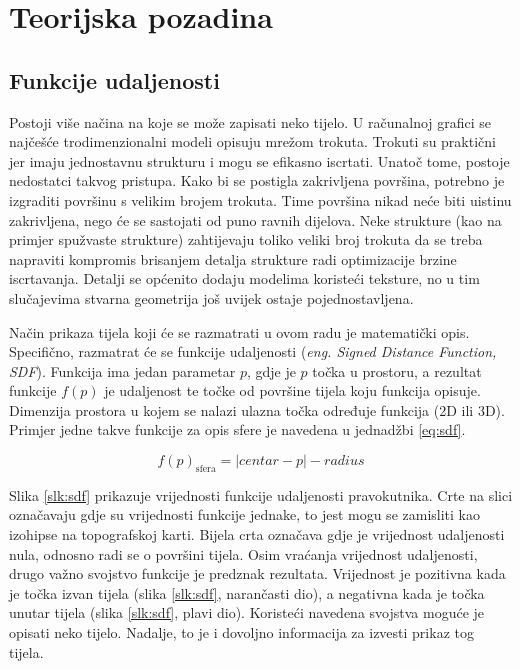 \documentclass[zavrsnirad, upload]{fer}
\begin{document}

\chapter{Teorijska pozadina}
\label{pog:teorija}

\section{Funkcije udaljenosti}
\label{podpog:funkcije_udaljenosti}

Postoji više načina na koje se može zapisati neko tijelo. U računalnoj grafici se najčešće trodimenzionalni modeli opisuju mrežom trokuta. Trokuti su praktični jer imaju jednostavnu strukturu i mogu se efikasno iscrtati. Unatoč tome, postoje nedostatci takvog pristupa. Kako bi se postigla zakrivljena površina, potrebno je izgraditi površinu s velikim brojem trokuta. Time površina nikad neće biti uistinu zakrivljena, nego će se sastojati od puno ravnih dijelova. Neke strukture (kao na primjer spužvaste strukture) zahtijevaju toliko veliki broj trokuta da se treba napraviti kompromis brisanjem detalja strukture radi optimizacije brzine iscrtavanja. Detalji se općenito dodaju modelima koristeći teksture, no u tim slučajevima stvarna geometrija još uvijek ostaje pojednostavljena.

Način prikaza tijela koji će se razmatrati u ovom radu je matematički opis. Specifično, razmatrat će se funkcije udaljenosti (\emph{eng. Signed Distance Function, SDF}). Funkcija ima jedan parametar $p$, gdje je $p$ točka u prostoru, a rezultat funkcije $f(p)$ je udaljenost te točke od površine tijela koju funkcija opisuje. Dimenzija prostora u kojem se nalazi ulazna točka određuje funkcija (2D ili 3D). Primjer jedne takve funkcije za opis sfere je navedena u jednadžbi \eqref{eq:sdf}.

\begin{equation}
	\label{eq:sdf}
	f(p)_{\text{sfera}} = |centar - p| - radius
\end{equation}

Slika \ref{slk:sdf} prikazuje vrijednosti funkcije udaljenosti pravokutnika. Crte na slici označavaju gdje su vrijednosti funkcije jednake, to jest mogu se zamisliti kao izohipse na topografskoj karti. Bijela crta označava gdje je vrijednost udaljenosti nula, odnosno radi se o površini tijela. Osim vraćanja vrijednost udaljenosti, drugo važno svojstvo funkcije je predznak rezultata. Vrijednost je pozitivna kada je točka izvan tijela (slika \ref{slk:sdf}, narančasti dio), a negativna kada je točka unutar tijela (slika \ref{slk:sdf}, plavi dio). Koristeći navedena svojstva moguće je opisati neko tijelo. Nadalje, to je i dovoljno informacija za izvesti prikaz tog tijela.
\end{document}
